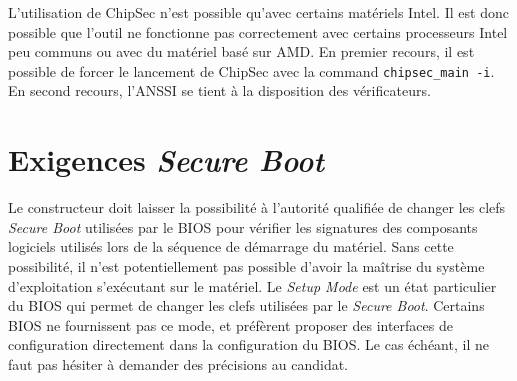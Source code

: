\documentclass{report}
\begin{document}
L’utilisation de {\sc ChipSec} n’est possible qu’avec certains matériels
Intel.
%
Il est donc possible que l’outil ne fonctionne pas correctement avec certains
processeurs Intel peu communs ou avec du matériel basé sur AMD.
%
En premier recours, il est possible de forcer le lancement de {\sc ChipSec} avec
la command \texttt{chipsec\_main -i}.
%
En second recours, l’ANSSI se tient à la disposition des vérificateurs.

\section{Exigences \og{}\emph{Secure Boot}\fg{}}

Le constructeur doit laisser la possibilité à l’autorité qualifiée de changer
les clefs \emph{Secure Boot} utilisées par le BIOS pour vérifier les signatures
des composants logiciels utilisés lors de la séquence de démarrage du matériel.
%
Sans cette possibilité, il n’est potentiellement pas possible d’avoir la
maîtrise du système d’exploitation s’exécutant sur le matériel.
%
Le \emph{Setup Mode} est un état particulier du BIOS qui permet de changer les
clefs utilisées par le \emph{Secure Boot}.
%
Certains BIOS ne fournissent pas ce mode, et préfèrent proposer des interfaces
de configuration directement dans la configuration du BIOS.
%
Le cas échéant, il ne faut pas hésiter à demander des précisions au candidat.
\end{document}
